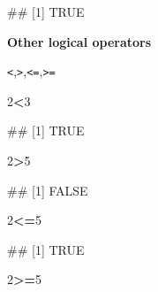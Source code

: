 \documentclass[
]{book}
\newenvironment{Shaded}{\begin{snugshade}}{\end{snugshade}}
\newcommand{\DecValTok}[1]{\textcolor[rgb]{0.00,0.00,0.81}{#1}}
\newcommand{\NormalTok}[1]{#1}
\newcommand{\SpecialCharTok}[1]{\textcolor[rgb]{0.81,0.36,0.00}{\textbf{#1}}}
\begin{document}
\begin{Shaded}
\begin{Highlighting}[]
\NormalTok{\#\# [1] TRUE}
\end{Highlighting}
\end{Shaded}

\textbf{Other logical operators}

\texttt{\textless{}},\texttt{\textgreater{}},\texttt{\textless{}=},\texttt{\textgreater{}=}

\begin{Shaded}
\begin{Highlighting}[]
\DecValTok{2}\SpecialCharTok{\textless{}}\DecValTok{3}
\end{Highlighting}
\end{Shaded}

\begin{Shaded}
\begin{Highlighting}[]
\NormalTok{\#\# [1] TRUE}
\end{Highlighting}
\end{Shaded}

\begin{Shaded}
\begin{Highlighting}[]
\DecValTok{2}\SpecialCharTok{\textgreater{}}\DecValTok{5}
\end{Highlighting}
\end{Shaded}

\begin{Shaded}
\begin{Highlighting}[]
\NormalTok{\#\# [1] FALSE}
\end{Highlighting}
\end{Shaded}

\begin{Shaded}
\begin{Highlighting}[]
\DecValTok{2}\SpecialCharTok{\textless{}=}\DecValTok{5}
\end{Highlighting}
\end{Shaded}

\begin{Shaded}
\begin{Highlighting}[]
\NormalTok{\#\# [1] TRUE}
\end{Highlighting}
\end{Shaded}

\begin{Shaded}
\begin{Highlighting}[]
\DecValTok{2}\SpecialCharTok{\textgreater{}=}\DecValTok{5}
\end{Highlighting}
\end{Shaded}
\end{document}
